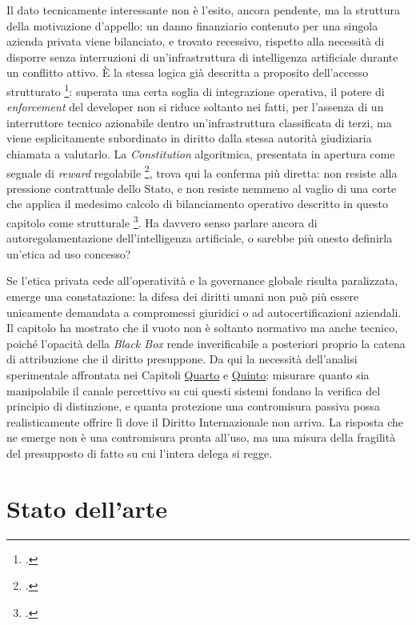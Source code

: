 \documentclass[a4paper,12pt]{report}
\begin{document}
Il dato tecnicamente interessante non è l'esito, ancora pendente, ma la struttura
della motivazione d'appello: un danno finanziario contenuto per una singola
azienda privata viene bilanciato, e trovato recessivo, rispetto alla necessità di
disporre senza interruzioni di un'infrastruttura di intelligenza artificiale
durante un conflitto attivo. È la stessa logica già descritta a proposito
dell'accesso strutturato \footcite{shevlane_2022_access}: superata una certa
soglia di integrazione operativa, il potere di \textit{enforcement} del developer
non si riduce soltanto nei fatti, per l'assenza di un interruttore tecnico
azionabile dentro un'infrastruttura classificata di terzi, ma viene esplicitamente
subordinato in diritto dalla stessa autorità giudiziaria chiamata a valutarlo. La
\textit{Constitution} algoritmica, presentata in apertura come segnale di
\textit{reward} regolabile \footcite{bai_2022_cai}, trova qui la conferma più
diretta: non resiste alla pressione contrattuale dello Stato, e non resiste
nemmeno al vaglio di una corte che applica il medesimo calcolo di bilanciamento
operativo descritto in questo capitolo come strutturale
\footcite{leggezero_anthropic_2026}. Ha davvero senso parlare ancora di
autoregolamentazione dell'intelligenza artificiale, o sarebbe più onesto definirla
un'etica ad uso concesso?

Se l'etica privata cede all'operatività e la governance globale risulta
paralizzata, emerge una constatazione: la difesa dei diritti umani non può più
essere unicamente demandata a compromessi giuridici o ad autocertificazioni
aziendali. Il capitolo ha mostrato che il vuoto non è soltanto normativo ma anche
tecnico, poiché l'opacità della \textit{Black Box} rende inverificabile a
posteriori proprio la catena di attribuzione che il diritto presuppone. Da qui la
necessità dell'analisi sperimentale affrontata nei Capitoli \hyperref[cap4]{Quarto} e \hyperref[cap5]{Quinto}: misurare quanto sia manipolabile il canale percettivo su cui questi sistemi fondano la
verifica del principio di distinzione, e quanta protezione una contromisura
passiva possa realisticamente offrire lì dove il Diritto Internazionale non
arriva. La risposta che ne emerge non è una contromisura pronta all'uso, ma una
misura della fragilità del presupposto di fatto su cui l'intera delega si regge.

\chapter{Stato dell'arte}
\label{cap3}
\end{document}
